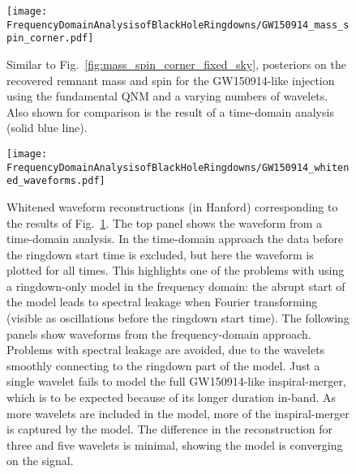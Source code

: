 \begin{figure}
	\centering
	\texttt{[image: FrequencyDomainAnalysisofBlackHoleRingdowns/GW150914\_mass\_spin\_corner.pdf]}
	\caption[Similar to Fig.~\ref{fig:mass_spin_corner_fixed_sky}, posteriors on the recovered remnant mass and spin for the GW150914-like injection using the fundamental QNM and a varying numbers of wavelets]{ 
		Similar to Fig.~\ref{fig:mass_spin_corner_fixed_sky}, posteriors on the recovered remnant mass and spin for the GW150914-like injection using the fundamental QNM and a varying numbers of wavelets. 
		Also shown for comparison is the result of a time-domain analysis (solid blue line).
	}
	\label{fig:GW150914_mass_spin_corner}
\end{figure}

\begin{figure}
	\centering
	\texttt{[image: FrequencyDomainAnalysisofBlackHoleRingdowns/GW150914\_whitened\_waveforms.pdf]}
	\caption[Whitened waveform reconstructions (in Hanford) corresponding to the results of Fig.~\ref{fig:GW150914_mass_spin_corner}]{ 
		Whitened waveform reconstructions (in Hanford) corresponding to the results of Fig.~\ref{fig:GW150914_mass_spin_corner}. 
		The top panel shows the waveform from a time-domain analysis. 
		In the time-domain approach the data before the ringdown start time is excluded, but here the waveform is plotted for all times.
		This highlights one of the problems with using a ringdown-only model in the frequency domain: the abrupt start of the model leads to spectral leakage when Fourier transforming (visible as oscillations before the ringdown start time).
		The following panels show waveforms from the frequency-domain approach.
		Problems with spectral leakage are avoided, due to the wavelets smoothly connecting to the ringdown part of the model.
		Just a single wavelet fails to model the full GW150914-like inspiral-merger, which is to be expected because of its longer duration in-band.
		As more wavelets are included in the model, more of the inspiral-merger is captured by the model.
		The difference in the reconstruction for three and five wavelets is minimal, showing the model is converging on the signal.
	}
	\label{fig:GW150914_whitened_waveforms}
\end{figure}

